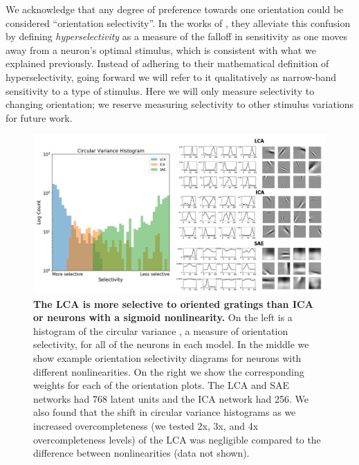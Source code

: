 We acknowledge that any degree of preference towards one orientation could be considered ``orientation selectivity''.
In the works of \parencite{golden2016conjectures,vilankar2017selectivity}, they alleviate this confusion by defining \textit{hyperselectivity} as a measure of the falloff in sensitivity as one moves away from a neuron's optimal stimulus, which is consistent with what we explained previously.
Instead of adhering to their mathematical definition of hyperselectivity, going forward we will refer to it qualitatively as narrow-band sensitivity to a type of stimulus.
Here we will only measure selectivity to changing orientation; we reserve measuring selectivity to other stimulus variations for future work.

\begin{figure}[h!]
    \centering
    \includegraphics[width=\textwidth]{figures/circular_variance_histogram.png}
    \caption{\textbf{The LCA is more selective to oriented gratings than ICA or neurons with a sigmoid nonlinearity.} On the left is a histogram of the circular variance \parencite{ringach2002orientation}, a measure of orientation selectivity, for all of the neurons in each model. In the middle we show example orientation selectivity diagrams for neurons with different nonlinearities. On the right we show the corresponding weights for each of the orientation plots. The LCA and SAE networks had 768 latent units and the ICA network had 256. We also found that the shift in circular variance histograms as we increased overcompleteness (we tested 2x, 3x, and 4x overcompleteness levels) of the LCA was negligible compared to the difference between nonlinearities (data not shown).}
    \label{fig:ch4_orientation_selectivity}
\end{figure}


